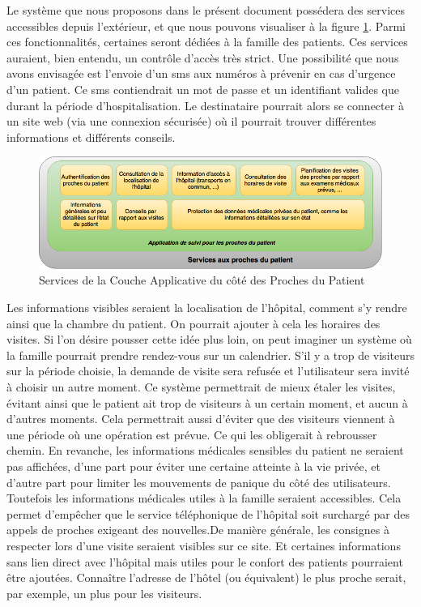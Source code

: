 Le système que nous proposons dans le présent document possédera des services accessibles depuis l'extérieur, et que nous pouvons visualiser à la figure \ref{famille}. Parmi ces
fonctionnalités, certaines seront dédiées à la famille des patients. Ces services auraient, bien entendu, un contrôle d'accès très
strict. Une possibilité que nous avons envisagée est l'envoie d'un sms aux numéros à prévenir en cas d'urgence d'un patient. Ce
sms contiendrait un mot de passe et un identifiant valides que durant la période d'hospitalisation. Le destinataire pourrait alors
se connecter à un site web (via une connexion sécurisée) où il pourrait trouver différentes informations et différents conseils.
\newline
\begin{figure}[h!]
	\hspace*{-2.5cm}
	\centering
	\includegraphics[width=1.4\textwidth]{famille.png}
	\caption{Services de la Couche Applicative du côté des Proches du Patient}
	\label{famille}
\end{figure}

Les informations visibles seraient la localisation de l'hôpital, comment s'y rendre ainsi que la chambre du patient. On pourrait
ajouter à cela les horaires des visites. Si l'on désire pousser cette idée plus loin, on peut imaginer un système où la famille
pourrait prendre rendez-vous sur un calendrier. S'il y a trop de visiteurs sur la période choisie, la demande de visite sera
refusée et l'utilisateur sera invité à choisir un autre moment. Ce système permettrait de mieux étaler les visites, évitant ainsi
que le patient ait trop de visiteurs à un certain moment, et aucun à d'autres moments. Cela permettrait aussi d'éviter que des
visiteurs viennent à une période où une opération est prévue. Ce qui les obligerait à rebrousser chemin. En revanche, les
informations médicales sensibles du patient ne seraient pas affichées, d'une part pour éviter une certaine atteinte à la vie
privée, et d'autre part pour limiter les mouvements de panique du côté des utilisateurs. Toutefois les informations médicales
utiles à la famille seraient accessibles. Cela permet d'empêcher que le service téléphonique de l'hôpital soit  surchargé par des
appels de proches exigeant des nouvelles.De manière générale, les consignes à respecter lors d'une visite seraient visibles sur
ce site. Et certaines informations sans lien direct avec l'hôpital mais utiles pour le confort des patients pourraient être
ajoutées. Connaître l'adresse de l'hôtel (ou équivalent) le plus proche serait, par exemple, un plus pour les visiteurs.
\newline

